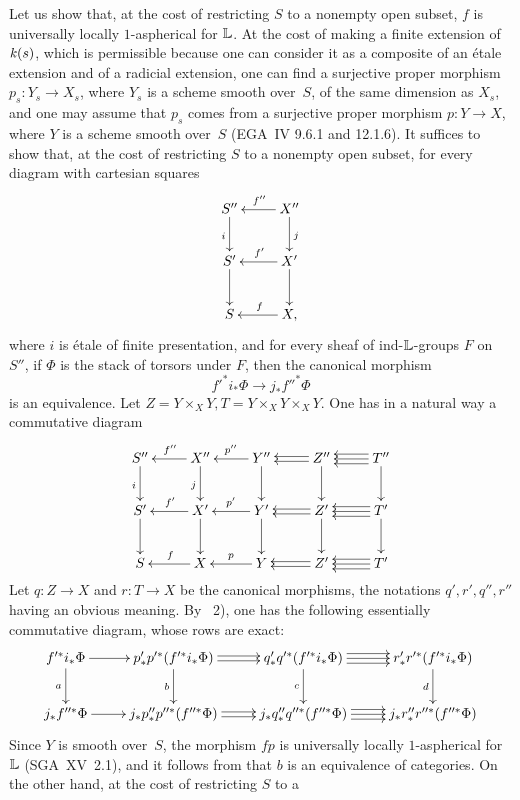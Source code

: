 Let us show that, at the cost of restricting $S$ to a nonempty open subset,
$f$ is universally locally $1$-aspherical for
$\mathbb{L}$. At the cost of making a
finite extension of~$\mathit{k}(s)$, which is permissible because one can
consider it as a composite of an \'etale extension and of a
radicial extension, one can find a surjective proper morphism
$p_s\colon Y_s\to X_s$, where $Y_s$ is a scheme smooth over~$S$,
of the same dimension as $X_s$, and one may assume that $p_s$
comes from a surjective proper morphism $p\colon Y\to X$, where $Y$
is a scheme smooth over~$S$ (EGA~IV 9.6.1 and 12.1.6). It suffices to
show that, at the cost of restricting $S$ to a nonempty open subset,
for every diagram with cartesian squares
$$
\xymatrix{ S''\ar[d]_i & X ''\ar[d]^j\ar[l]_{f''} \\ S'\ar[d] &
X'\ar[d]\ar[l]_{f'} \\ S & X, \ar[l]_f }
$$
where $i$ is \'etale of finite presentation, and for every
sheaf of ind-$\mathbb{L}$-groups $F$ on~$S''$, if $\Phi$ is the stack
of torsors under $F$, then the canonical morphism
$$
{f'}^*i_*\Phi \to j_*{f''}^*\Phi
$$
is an equivalence. Let $Z=Y\times_{X}Y,
T=Y\times_{X}Y\times_{X}Y$. One has in a natural way a commutative
diagram
$$
\xymatrix{ S'' \ar[d]_i & X''\ar[l]_{f''}\ar[d]_j &
Y''\ar[l]_{p''}\ar[d] & Z''\ar[d]\ar@<-.4ex>[l]\ar@<.4ex>[l] &
T''\ar[d]\ar[l]\ar@<-.8ex>[l]\ar@<.8ex>[l] \\ S' \ar[d] & X'
\ar[l]_{f'}\ar[d] & Y'\ar[d]\ar[l]_{p'}&
Z'\ar[d]\ar@<-.4ex>[l]\ar@<.4ex>[l] &
T'\ar[d]\ar[l]\ar@<-.8ex>[l]\ar@<.8ex>[l] \\ S & X\ar[l]_f & Y\ar[l]_p
& Z'\ar@<-.4ex>[l]\ar@<.4ex>[l] & T'\ar[l]\ar@<-.8ex>[l]\ar@<.8ex>[l]
}
$$
Let
$q\colon Z\to X$ and $r\colon T\to X$ be the canonical morphisms,
the notations $q', r', q'', r''$ having an obvious
meaning. By ~2), one has the following
essentially commutative diagram, whose rows are exact:
$$
\xymatrix{ f'^* i_*\Phi \ar[r]\ar[d]_a &
p'_*p'^*(f'^*i_*\Phi)\ar[d]_b\ar@<-.4ex>[r]\ar@<.4ex>[r] &
q'_*q'^*(f'^*i_*\Phi)\ar[d]_c\ar[r]\ar@<-.8ex>[r]\ar@<.8ex>[r]&
r'_*r'^*(f'^*i_*\Phi)\ar[d]_d \\ j_*f''^*\Phi \ar[r]&
j_*p''_*p''^*(f''^*\Phi)\ar@<-.4ex>[r]\ar@<.4ex>[r] &
j_*q''_*q''^*(f''^*\Phi)\ar[r]\ar@<-.8ex>[r]\ar@<.8ex>[r]&
j_*r''_*r''^*(f''^*\Phi) }
$$
Since $Y$ is smooth over~$S$, the morphism $fp$ is universally
locally $1$-aspherical for $\mathbb{L}$ (SGA~XV~2.1),
and it follows from \cite[VII 2.1.7]{XIII.2} that $b$ is an equivalence of
categories. On the other hand, at the cost of restricting $S$ to a
